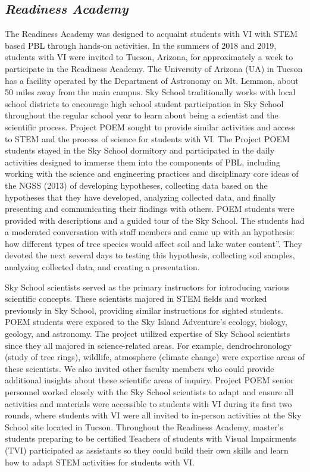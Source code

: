 \documentclass[11pt]{sig-alternate}
\begin{document}
\begin{large}
\section*{\textit{Readiness Academy}}

The Readiness Academy was designed to acquaint students with VI with STEM based PBL through hands-on activities. In the summers of 2018 and 2019, students with VI were invited to Tucson, Arizona, for approximately a week to participate in the Readiness Academy. The University of Arizona (UA) in Tucson has a facility operated by the Department of Astronomy on Mt. Lemmon, about 50 miles away from the main campus. Sky School traditionally works with local school districts to encourage high school student participation in Sky School throughout the regular school year to learn about being a scientist and the scientific process. Project POEM sought to provide similar activities and access to STEM and the process of science for students with VI. The Project POEM students stayed in the Sky School dormitory and participated in the daily activities designed to immerse them into the components of PBL, including working with the science and engineering practices and disciplinary core ideas of the NGSS (2013) of developing hypotheses, collecting data based on the hypotheses that they have developed, analyzing collected data, and finally presenting and communicating their findings with others. POEM students were provided with descriptions and a guided tour of the Sky School. The students had a moderated conversation with staff members and came up with an hypothesis: how different types of tree species would affect soil and lake water content”. They devoted the next several days to testing this hypothesis, collecting soil samples, analyzing collected data, and creating a presentation.

Sky School scientists served as the primary instructors for introducing various scientific concepts. These scientists majored in STEM fields and worked previously in Sky School, providing similar instructions for sighted students. POEM students were exposed to the Sky Island Adventure’s ecology, biology, geology, and astronomy. The project utilized expertise of Sky School scientists since they all majored in science-related areas. For example, dendrochronology (study of tree rings), wildlife, atmosphere (climate change) were expertise areas of these scientists. We also invited other faculty members who could provide additional insights about these scientific areas of inquiry. Project POEM senior personnel worked closely with the Sky School scientists to adapt and ensure all activities and materials were accessible to students with VI during its first two rounds, where students with VI were all invited to in-person activities at the Sky School site located in Tucson. Throughout the Readiness Academy, master’s students preparing to be certified Teachers of students with Visual Impairments (TVI) participated as assistants so they could build their own skills and learn how to adapt STEM activities for students with VI.


\end{large}
\end{document}
